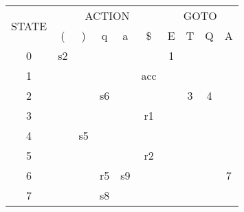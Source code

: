 \documentclass[10pt]{article}
\begin{document}
\begin{figure}[H]
    \centering
    \begin{tabular}{|c|ccccc||cccc|}
		\hline
		\multirow{2}{*}{STATE} & \multicolumn{5}{c||}{ACTION}                                                                                 & \multicolumn{4}{c|}{GOTO}                                                     \\ \cline{2-10} 
		& \multicolumn{1}{c|}{(}  & \multicolumn{1}{c|}{)}  & \multicolumn{1}{c|}{q}  & \multicolumn{1}{c|}{a}  & \$  & \multicolumn{1}{c|}{E} & \multicolumn{1}{c|}{T} & \multicolumn{1}{c|}{Q} & A  \\ \hline
		0                      & \multicolumn{1}{c|}{s2} & \multicolumn{1}{c|}{}   & \multicolumn{1}{c|}{}   & \multicolumn{1}{c|}{}   &     & \multicolumn{1}{c|}{1} & \multicolumn{1}{c|}{}  & \multicolumn{1}{c|}{}  &    \\ \hline
		1                      & \multicolumn{1}{c|}{}   & \multicolumn{1}{c|}{}   & \multicolumn{1}{c|}{}   & \multicolumn{1}{c|}{}   & acc & \multicolumn{1}{c|}{}  & \multicolumn{1}{c|}{}  & \multicolumn{1}{c|}{}  &    \\ \hline
		2                      & \multicolumn{1}{c|}{}   & \multicolumn{1}{c|}{}   & \multicolumn{1}{c|}{s6} & \multicolumn{1}{c|}{}   &     & \multicolumn{1}{c|}{}  & \multicolumn{1}{c|}{3} & \multicolumn{1}{c|}{4} &    \\ \hline
		3                      & \multicolumn{1}{c|}{}   & \multicolumn{1}{c|}{}   & \multicolumn{1}{c|}{}   & \multicolumn{1}{c|}{}   & r1  & \multicolumn{1}{c|}{}  & \multicolumn{1}{c|}{}  & \multicolumn{1}{c|}{}  &    \\ \hline
		4                      & \multicolumn{1}{c|}{}   & \multicolumn{1}{c|}{s5} & \multicolumn{1}{c|}{}   & \multicolumn{1}{c|}{}   &     & \multicolumn{1}{c|}{}  & \multicolumn{1}{c|}{}  & \multicolumn{1}{c|}{}  &    \\ \hline
		5                      & \multicolumn{1}{c|}{}   & \multicolumn{1}{c|}{}   & \multicolumn{1}{c|}{}   & \multicolumn{1}{c|}{}   & r2  & \multicolumn{1}{c|}{}  & \multicolumn{1}{c|}{}  & \multicolumn{1}{c|}{}  &    \\ \hline
		6                      & \multicolumn{1}{c|}{}   & \multicolumn{1}{c|}{}   & \multicolumn{1}{c|}{r5} & \multicolumn{1}{c|}{s9} &     & \multicolumn{1}{c|}{}  & \multicolumn{1}{c|}{}  & \multicolumn{1}{c|}{}  & 7  \\ \hline
		7                      & \multicolumn{1}{c|}{}   & \multicolumn{1}{c|}{}   & \multicolumn{1}{c|}{s8} & \multicolumn{1}{c|}{}   &     & \multicolumn{1}{c|}{}  & \multicolumn{1}{c|}{}  & \multicolumn{1}{c|}{}  &    \\ \hline

\end{tabular}
\end{figure}
\end{document}
